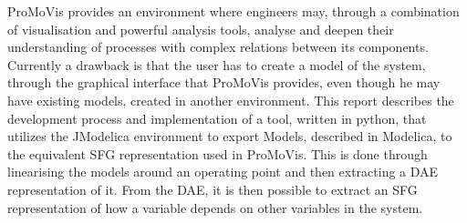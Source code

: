 ProMoVis provides an environment where engineers may, through a combination of visualisation and powerful analysis tools, analyse and deepen their understanding of processes with complex relations between its components. Currently a drawback is that the user has to create a model of the system, through the graphical interface that ProMoVis provides, even though he may have existing models, created in another environment. This report describes the development process and implementation of a tool, written in python, that utilizes the JModelica environment to export Models, described in Modelica, to the equivalent SFG representation used in ProMoVis. This is done through linearising the models around an operating point and then extracting a DAE representation of it. From the DAE, it is then possible to extract an SFG representation of how a variable depends on other variables in the system.